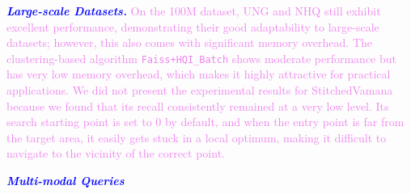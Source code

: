 \documentclass[sigconf, nonacm]{acmart}
\begin{document}
	\textit{\textbf{\textcolor{blue}{Large-scale Datasets.}}} 
	\textcolor{violet}{On the 100M dataset, UNG and NHQ still exhibit excellent performance, demonstrating their good adaptability to large-scale datasets; however, this also comes with significant memory overhead. The clustering-based algorithm \texttt{Faiss+HQI\_Batch} shows moderate performance but has very low memory overhead, which makes it highly attractive for practical applications. We did not present the experimental results for StitchedVamana because we found that its recall consistently remained at a very low level. Its search starting point is set to 0 by default, and when the entry point is far from the target area, it easily gets stuck in a local optimum, making it difficult to navigate to the vicinity of the correct point.}
	
\textit{\textbf{\textcolor{blue}{Multi-modal Queries}}} 
\end{document}
